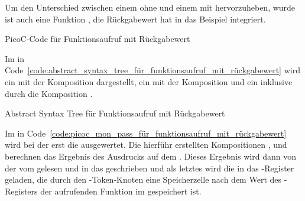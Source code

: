 Um den Unterschied zwischen einem  ohne  und einem  mit  hervorzuheben, wurde ist auch eine Funktion , die  Rückgabewert hat in das Beispiel integriert.

\begin{code}
  \centering
  \caption{PicoC-Code für Funktionsaufruf mit Rückgabewert}
  \label{code:picoc_code_für_funktionsaufruf_mit_rückgabewert}
\end{code}

Im  in Code~\ref{code:abstract_syntax_tree_für_funktionsaufruf_mit_rückgabewert} wird ein   mit der Komposition  dargestellt, ein   mit der Komposition  und ein  inklusive   durch die Komposition .

\begin{code}
  \centering
  \caption{Abstract Syntax Tree für Funktionsaufruf mit Rückgabewert}
  \label{code:abstract_syntax_tree_für_funktionsaufruf_mit_rückgabewert}
\end{code}

Im  in Code~\ref{code:picoc_mon_pass_für_funktionsaufruf_mit_rückgabewert} wird bei der   erst die   ausgewertet. Die hierführ erstellten Kompositionen ,  und  berechnen das Ergebnis des Ausdrucks  auf dem . Dieses Ergebnis wird dann von der   vom  gelesen und in das   geschrieben und als letztes wird die  in  das -Register geladen, die durch den -Token-Knoten eine Speicherzelle nach dem Wert des -Registers der aufrufenden Funktion im  gespeichert ist.

